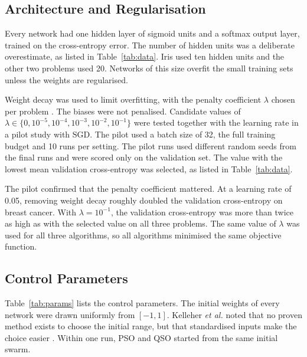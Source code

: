 \documentclass[conference]{IEEEtran}
\begin{document}
\subsection{Architecture and Regularisation}
Every network had one hidden layer of sigmoid units and a softmax
output layer, trained on the cross-entropy error. The number of hidden
units was a deliberate overestimate, as listed in Table~\ref{tab:data}.
Iris used ten hidden units and the other two problems used 20.
Networks of this size overfit the small training sets unless the
weights are regularised.

Weight decay was used to limit overfitting, with the penalty
coefficient $\lambda$ chosen per problem \cite{goodfellow2016}. The biases
were not penalised. Candidate values of
$\lambda \in \{0, 10^{-5}, 10^{-4}, 10^{-3}, 10^{-2}, 10^{-1}\}$ were
tested together with the learning rate in a pilot study with SGD. The
pilot used a batch size of 32, the full training budget and 10 runs
per setting. The pilot runs used different random seeds from the final
runs and were scored only on the validation set. The value with the
lowest mean validation cross-entropy was selected, as listed in
Table~\ref{tab:data}.

The pilot confirmed that the penalty coefficient mattered. At a
learning rate of 0.05, removing weight decay roughly doubled the
validation cross-entropy on breast cancer. With $\lambda = 10^{-1}$,
the validation cross-entropy was more than twice as high as with the
selected value on all three problems. The same value of $\lambda$ was used
for all three algorithms, so all algorithms minimised the same
objective function.

\subsection{Control Parameters}
Table~\ref{tab:params} lists the control parameters. The initial
weights of every network were drawn uniformly from $[-1, 1]$. Kelleher
\textit{et al.} noted that no proven method exists to choose the
initial range, but that standardised inputs make the choice easier
\cite{kelleher2015}. Within one run, PSO and QSO started
from the same initial swarm.
\end{document}
